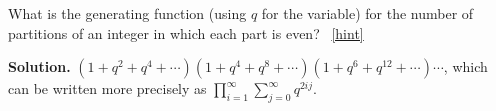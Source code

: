\documentclass{book}
\begin{document}
\setcounter{project}{321}
\addtocounter{project}{-1}
\begin{activity}[]\label{activity-314}
\hypertarget{p-1647}{}%
What is the generating function (using \(q\) for the variable) for the number of partitions of an integer in which each part is even?%
~\hfill{\tiny\hyperlink{a-321}{[hint]}\hypertarget{q-321}{}}\par\smallskip%
\noindent\textbf{Solution.}\hypertarget{solution-245}{}\quad%
\hypertarget{p-1649}{}%
\((1+q^2+q^4+\cdots)(1+q^4+q^8+\cdots)(1+q^6+q^{12}+\cdots)\cdots\), which can be written more precisely as \(\displaystyle\prod_{i=1}^\infty
\sum_{j=0}^\infty q^{2ij}\).%
\end{activity}
\end{document}
